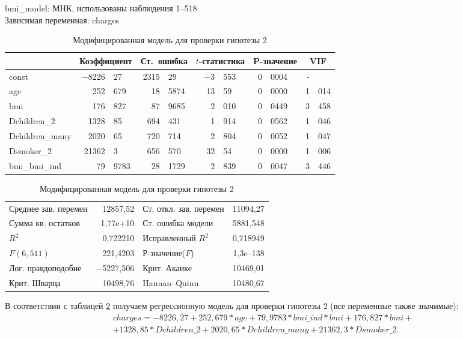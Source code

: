 \documentclass[a4paper,12pt]{article}
\begin{document}
\begin{table}[H]
	\begin{center}
		bmi\_model:
		МНК, использованы наблюдения 1--518\\
		Зависимая переменная: charges\\
		\vspace{1em}
		\begin{tabular}{|l|r@{,}l|r@{,}l|r@{,}l|r@{,}l|r@{,}l|}
			\hline
			&
			\multicolumn{2}{c|}{Коэффициент} &
			\multicolumn{2}{c|}{Ст.\ ошибка} &
			\multicolumn{2}{c|}{$t$-статистика} &
			\multicolumn{2}{c|}{P-значение} &
			\multicolumn{2}{c|}{VIF} \\[1ex]
			\hline
			const & $-$8226&27 & 2315&29 & $-$3&553 & 0&0004 & -& \\
			\hline
			age & 252&679 & 18&5874 & 13&59 & 0&0000 & 1&014 \\
			\hline
			bmi & 176&827 &	87&9685 & 2&010 & 0&0449 & 3&458 \\
			\hline
			Dchildren\_2 & 1328&85 & 694&431 & 1&914 & 0&0562 & 1&046 \\
			\hline
			Dchildren\_many & 2020&65 &	720&714 & 2&804 & 0&0052 & 1&047 \\
			\hline
			Dsmoker\_2 & 21362&3 & 656&570 & 32&54 & 0&0000 & 1&006 \\
			\hline
			bmi\_bmi\_ind &	79&9783 & 28&1729 &	2&839 &	0&0047 & 3&446 \\
			\hline
		\end{tabular}	
		\vspace{1ex}
		\begin{tabular}{lrlr}
			Среднее зав. перемен &  12857,52 & Ст. откл. зав. перемен &  11094,27 \\
			Сумма кв. остатков &  1,77\textrm{e+10} & Ст. ошибка модели &  5881,548 \\
			$R^2$ &  0,722210 & Исправленный $R^2$ &  0,718949 \\
			$F(6, 511)$ &  221,4203 & Р-значение($F$) &  1,3\textrm{e--138} \\
			Лог. правдоподобие & $-$5227,506 & Крит. Акаике &  10469,01 \\
			Крит. Шварца &  10498,76 & Hannan--Quinn &  10480,67 \\
		\end{tabular}	
	\end{center}
	\caption{Модифицированная модель для проверки гипотезы 2}
	\label{tab:bmi-model}
\end{table} 

В соответствии с таблицей \ref{tab:bmi-model} получаем регрессионную модель для проверки гипотезы 2 (все переменные также значимые):
\begin{align*}
charges = -8226,27 + 252,679 * age + 79,9783 * bmi\_ind * bmi + 176,827 * bmi + \\ + 1328,85 * Dchildren\_2  + 2020,65 * Dchildren\_many + 21362,3 * Dsmoker\_2.
\end{align*}
\end{document}
